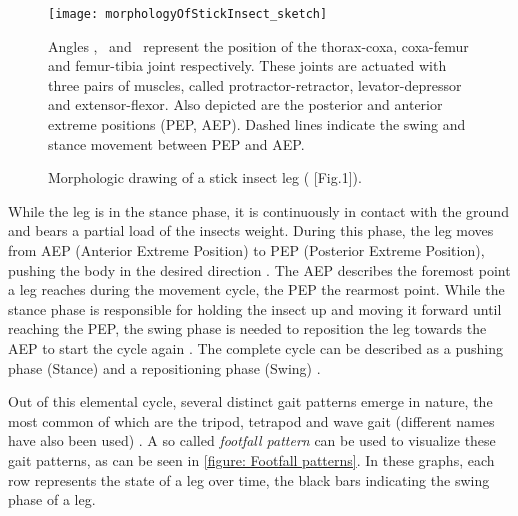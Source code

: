 \begin{figure}[h]
	\centerline{\texttt{[image: morphologyOfStickInsect\_sketch]}}
	\caption[Morphologic drawing of stick insect]{Morphologic drawing of a stick insect leg (\cite{schilling2013walknet} [Fig.1]).}
	\begin{footnotesize}
		Angles \textalpha, \textbeta \ and \textgamma \ represent the position of the thorax-coxa, coxa-femur and femur-tibia joint respectively.
		These joints are actuated with three pairs of muscles, called protractor-retractor, levator-depressor and extensor-flexor.
		Also depicted are the posterior and anterior extreme positions (PEP, AEP).
		Dashed lines indicate the swing and stance movement between PEP and AEP.
	\end{footnotesize}
	\label{figure: Stick insect leg}
\end{figure}

While the leg is in the stance phase, it is continuously in contact with the ground and bears a partial load of the insects weight.
During this phase, the leg moves from AEP (Anterior Extreme Position) to PEP (Posterior Extreme Position), pushing the body in the desired direction \parencite{schilling2013walknet}.
The AEP describes the foremost point a leg reaches during the movement cycle, the PEP the rearmost point.
While the stance phase is responsible for holding the insect up and moving it forward until reaching the PEP, the swing phase is needed to reposition the leg towards the AEP to start the cycle again \parencite{schilling2013walknet}.
The complete cycle can be described as a pushing phase (Stance) and a repositioning phase (Swing) .

Out of this elemental cycle, several distinct gait patterns emerge in nature, the most common of which are the tripod, tetrapod and wave gait (different names have also been used) \parencite{trotta2022walking,schilling2013walknet}.
A so called \textit{footfall pattern} can be used to visualize these gait patterns, as can be seen in \ref{figure: Footfall patterns}.
In these graphs, each row represents the state of a leg over time, the black bars indicating the swing phase of a leg.

